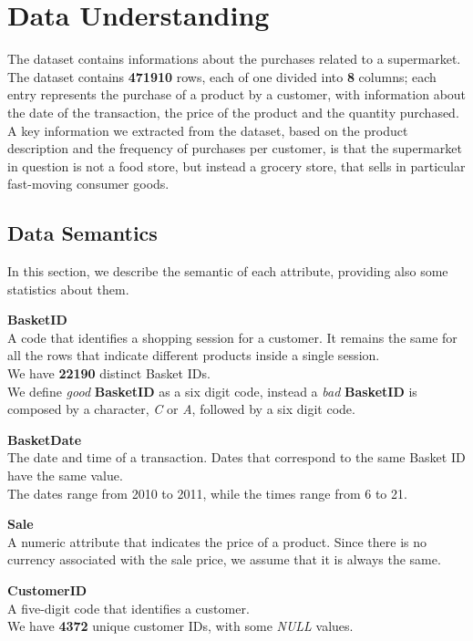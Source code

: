 \section{Data Understanding}

The dataset contains informations about the purchases related to a supermarket. The dataset contains \textbf{471910} rows, each of one divided into \textbf{8} columns; each entry represents the purchase of a product by a customer, with information about the date of the transaction, the price of the product and the quantity purchased.\\
A key information we extracted from the dataset, based on the product description and the frequency of purchases per customer, is that the supermarket in question is not a food store, but instead a grocery store, that sells in particular fast-moving consumer goods.

\subsection{Data Semantics}

In this section, we describe the semantic of each attribute, providing also some statistics about them.

\textbf{BasketID} \\
A code that identifies a shopping session for a customer. It remains the same for all the rows that indicate different products inside a single session.\\
We have \textbf{22190} distinct Basket IDs.\\
We define \emph{good} \textbf{BasketID} as a six digit code, instead a \emph{bad} \textbf{BasketID} is composed by a character, \emph{C} or \emph{A}, followed by a six digit code.

\textbf{BasketDate}\\
The date and time of a transaction. Dates that correspond to the same Basket ID have the same value.\\
The dates range from 2010 to 2011, while the times range from 6 to 21.

\textbf{Sale}\\
A numeric attribute that indicates the price of a product.
Since there is no currency associated with the sale price, we assume that it is always the same.

\textbf{CustomerID}\\
A five-digit code that identifies a customer.\\
We have \textbf{4372} unique customer IDs, with some \emph{NULL} values.

